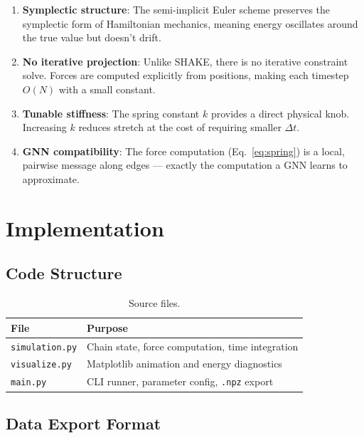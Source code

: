 \documentclass[11pt,a4paper]{article}
\begin{document}
\begin{enumerate}
    \item \textbf{Symplectic structure}: The semi-implicit Euler scheme
          preserves the symplectic form of Hamiltonian mechanics, meaning
          energy oscillates around the true value but doesn't drift.
    \item \textbf{No iterative projection}: Unlike SHAKE, there is no
          iterative constraint solve. Forces are computed explicitly from
          positions, making each timestep $O(N)$ with a small constant.
    \item \textbf{Tunable stiffness}: The spring constant $k$ provides a
          direct physical knob. Increasing $k$ reduces stretch at the cost
          of requiring smaller $\Delta t$.
    \item \textbf{GNN compatibility}: The force computation
          (Eq.~\ref{eq:spring}) is a local, pairwise message along edges
          --- exactly the computation a GNN learns to approximate.
\end{enumerate}

\section{Implementation}

\subsection{Code Structure}

\begin{table}[H]
\centering
\begin{tabular}{ll}
\toprule
File & Purpose \\
\midrule
\texttt{simulation.py} & Chain state, force computation, time integration \\
\texttt{visualize.py}   & Matplotlib animation and energy diagnostics \\
\texttt{main.py}        & CLI runner, parameter config, \texttt{.npz} export \\
\bottomrule
\end{tabular}
\caption{Source files.}
\end{table}

\subsection{Data Export Format}
\end{document}
